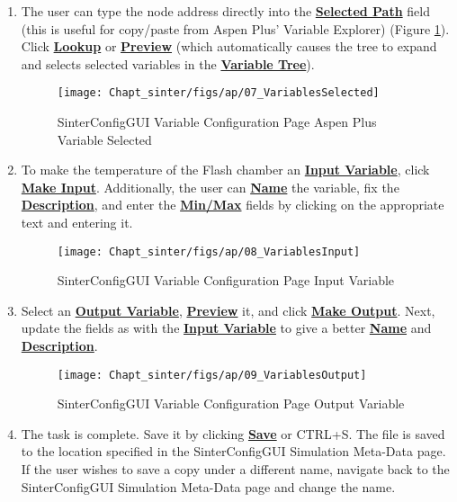 \begin{enumerate}
\item The user can type the node address directly into the \textbf{\underline{Selected Path}} field (this is useful for copy/paste from Aspen Plus' Variable Explorer) (Figure \ref{fig.sinter.ap.selectvar}). Click \textbf{\underline{Lookup}} or \textbf{\underline{Preview}} (which automatically causes the tree to expand and selects selected variables in the \textbf{\underline{Variable Tree}}).
  \begin{figure}[H]
	\begin{center}
		\texttt{[image: Chapt\_sinter/figs/ap/07\_VariablesSelected]}
		\caption{SinterConfigGUI Variable Configuration Page Aspen Plus Variable Selected}
		\label{fig.sinter.ap.selectvar}
	\end{center}
  \end{figure}
\item To make the temperature of the Flash chamber an \textbf{\underline{Input Variable}}, click \textbf{\underline{Make Input}}. Additionally, the user can \textbf{\underline{Name}} the variable, fix the \textbf{\underline{Description}}, and enter the \textbf{\underline{Min/Max}} fields by clicking on the appropriate text and entering it.
  \begin{figure}[H]
	\begin{center}
		\texttt{[image: Chapt\_sinter/figs/ap/08\_VariablesInput]}
		\caption{SinterConfigGUI Variable Configuration Page Input Variable}
		\label{fig.sinter.ap.inputvar}
	\end{center}
  \end{figure}
\item Select an \textbf{\underline{Output Variable}}, \textbf{\underline{Preview}} it, and click \textbf{\underline{Make Output}}. Next, update the fields as with the \textbf{\underline{Input Variable}} to give a better \textbf{\underline{Name}} and \textbf{\underline{Description}}.
  \begin{figure}[H]
	\begin{center}
		\texttt{[image: Chapt\_sinter/figs/ap/09\_VariablesOutput]}
		\caption{SinterConfigGUI Variable Configuration Page Output Variable}
		\label{fig.sinter.ap.outputvar}
	\end{center}
  \end{figure}
\item The task is complete. Save it by clicking \textbf{\underline{Save}} or CTRL+S. The file is saved to the location specified in the
  SinterConfigGUI Simulation Meta-Data page. If the user wishes to save a copy under a different name,
  navigate back to the SinterConfigGUI Simulation Meta-Data page and change the name. 
\end{enumerate}
